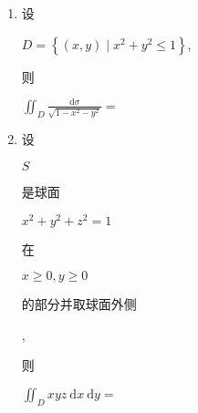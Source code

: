 \documentclass[10pt]{article}
\begin{document}
\begin{enumerate}
  \item \begin{CJK}{UTF8}{mj}设\end{CJK} $D=\left\{(x, y) \mid x^{2}+y^{2} \leqslant 1\right\}$, \begin{CJK}{UTF8}{mj}则\end{CJK} $\iint_{D} \frac{\mathrm{d} \sigma}{\sqrt{1-x^{2}-y^{2}}}=$

  \item \begin{CJK}{UTF8}{mj}设\end{CJK} $S$ \begin{CJK}{UTF8}{mj}是球面\end{CJK} $x^{2}+y^{2}+z^{2}=1$ \begin{CJK}{UTF8}{mj}在\end{CJK} $x \geqslant 0, y \geqslant 0$ \begin{CJK}{UTF8}{mj}的部分并取球面外侧\end{CJK}, \begin{CJK}{UTF8}{mj}则\end{CJK} $\iint_{D} x y z \mathrm{~d} x \mathrm{~d} y=$

\end{enumerate}
\end{document}
